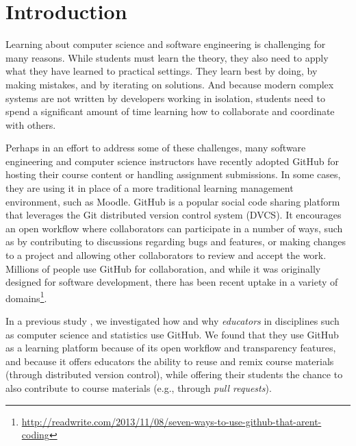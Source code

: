 \section{Introduction}


Learning about computer science and software engineering is challenging for many reasons. While students must learn the theory, they also need to apply what they have learned to practical settings. They learn best by doing, by making mistakes, and by iterating on solutions. And because modern complex systems are not written by developers working in isolation, students need to spend a significant amount of time learning how to collaborate and coordinate with others.

Perhaps in an effort to address some of these challenges, many software engineering and computer science instructors have recently adopted GitHub for hosting their course content or handling assignment submissions. In some cases, they are using it in place of a more traditional learning management environment, such as Moodle.
%
GitHub is a popular social code sharing platform that leverages the Git distributed version control system (DVCS). It encourages an open workflow where collaborators can participate in a number of ways, such as by contributing to discussions regarding bugs and features, or making changes to a project and allowing other collaborators to review and accept the work. Millions of people use GitHub for collaboration, and while it was originally designed for software development, there has been recent uptake in a variety of domains\footnote{\url{http://readwrite.com/2013/11/08/seven-ways-to-use-github-that-arent-coding}}.

In a previous study \cite{zagalsky2015emergence}, we investigated how and why \emph{educators} in disciplines such as computer science and statistics use GitHub. We found that they use GitHub as a learning platform because of its open workflow and transparency features, and because it offers educators the ability to reuse and remix course materials (through distributed version control), while offering their students the chance to also contribute to course materials (e.g., through \emph{pull requests}).

